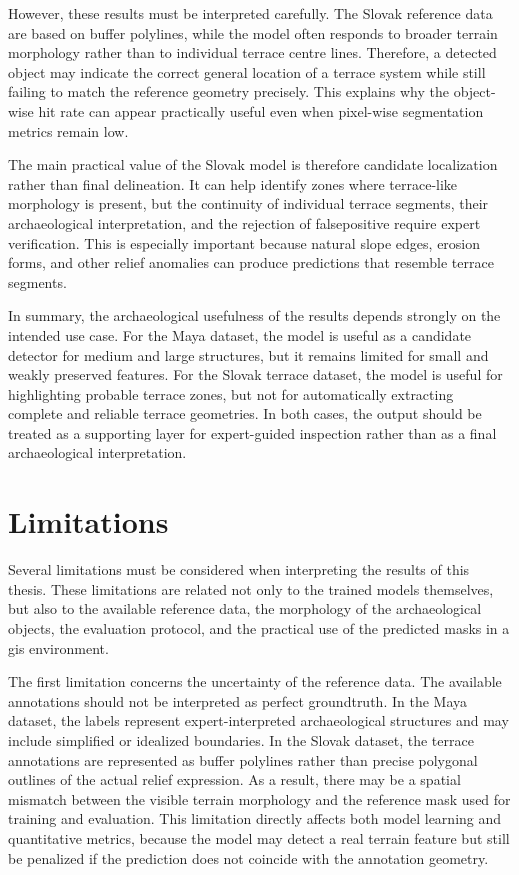However, these results must be interpreted carefully. The Slovak reference data are based on \gls{buffer} polylines, while the model often responds to broader terrain morphology rather than to individual terrace centre lines. Therefore, a detected object may indicate the correct general location of a terrace system while still failing to match the reference geometry precisely. This explains why the object-wise hit rate can appear practically useful even when pixel-wise segmentation metrics remain low.

The main practical value of the Slovak model is therefore candidate localization rather than final delineation. It can help identify zones where terrace-like morphology is present, but the continuity of individual terrace segments, their archaeological interpretation, and the rejection of \gls{falsepositive} require expert verification. This is especially important because natural \gls{slope} edges, erosion forms, and other relief anomalies can produce predictions that resemble terrace segments.

In summary, the archaeological usefulness of the results depends strongly on the intended use case. For the Maya dataset, the model is useful as a candidate detector for medium and large structures, but it remains limited for small and weakly preserved features. For the Slovak terrace dataset, the model is useful for highlighting probable terrace zones, but not for automatically extracting complete and reliable terrace geometries. In both cases, the output should be treated as a supporting layer for expert-guided inspection rather than as a final archaeological interpretation.

\section{Limitations}

Several limitations must be considered when interpreting the results of this thesis. These limitations are related not only to the trained models themselves, but also to the available reference data, the morphology of the archaeological objects, the evaluation protocol, and the practical use of the predicted masks in a \gls{gis} environment.

The first limitation concerns the uncertainty of the reference data. The available annotations should not be interpreted as perfect \gls{groundtruth}. In the Maya dataset, the labels represent expert-interpreted archaeological structures and may include simplified or idealized boundaries. In the Slovak dataset, the terrace annotations are represented as \gls{buffer} polylines rather than precise polygonal outlines of the actual relief expression. As a result, there may be a spatial mismatch between the visible terrain morphology and the reference mask used for training and evaluation. This limitation directly affects both model learning and quantitative metrics, because the model may detect a real terrain feature but still be penalized if the prediction does not coincide with the annotation geometry.

